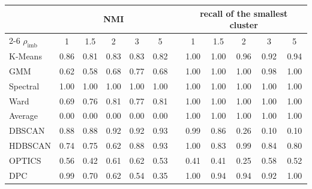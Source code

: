 \begin{tabular}{@{}lccccccccccc@{}}
\toprule
 & \multicolumn{5}{c}{NMI} & & \multicolumn{5}{c}{recall of the smallest cluster} \\
\cmidrule{2-6}\cmidrule{8-12}
$\rho_{\text{imb}}$ & 1 & 1.5 & 2 & 3 & 5 & & 1 & 1.5 & 2 & 3 & 5 \\
\midrule
K-Means & 0.86 & 0.81 & 0.83 & 0.83 & 0.82 & & 1.00 & 1.00 & 0.96 & 0.92 & 0.94 \\
GMM & 0.62 & 0.58 & 0.68 & 0.77 & 0.68 & & 1.00 & 1.00 & 1.00 & 0.98 & 1.00 \\
Spectral & 1.00 & 1.00 & 1.00 & 1.00 & 1.00 & & 1.00 & 1.00 & 1.00 & 1.00 & 1.00 \\
Ward & 0.69 & 0.76 & 0.81 & 0.77 & 0.81 & & 1.00 & 1.00 & 1.00 & 1.00 & 1.00 \\
Average & 0.00 & 0.00 & 0.00 & 0.00 & 0.00 & & 1.00 & 1.00 & 1.00 & 1.00 & 1.00 \\
DBSCAN & 0.88 & 0.88 & 0.92 & 0.92 & 0.93 & & 0.99 & 0.86 & 0.26 & 0.10 & 0.10 \\
HDBSCAN & 0.74 & 0.75 & 0.62 & 0.88 & 0.93 & & 1.00 & 0.83 & 0.99 & 0.84 & 0.80 \\
OPTICS & 0.56 & 0.42 & 0.61 & 0.62 & 0.53 & & 0.41 & 0.41 & 0.25 & 0.58 & 0.52 \\
DPC & 0.99 & 0.70 & 0.62 & 0.54 & 0.35 & & 1.00 & 0.94 & 0.94 & 0.92 & 1.00 \\
\bottomrule
\end{tabular}

